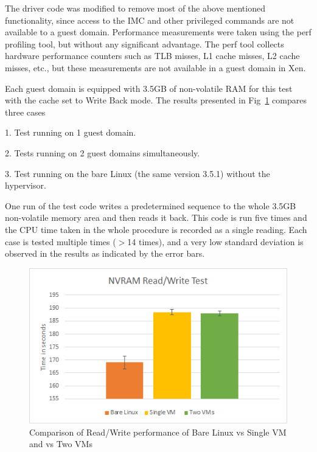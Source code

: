 The driver code was modified to remove most of the above mentioned functionality, since access to the IMC and other privileged commands are not available to a guest domain. Performance measurements were taken using the perf profiling tool, but without any significant advantage. The perf tool collects hardware performance counters such as TLB misses, L1 cache misses, L2 cache misses, etc., but these measurements are not available in a guest domain in Xen.

Each guest domain is equipped with 3.5GB of non-volatile RAM for this test with the cache set to Write Back mode. The results presented in Fig~\ref{fig:result_fig} compares three cases

1. Test running on 1 guest domain.

2. Tests running on 2 guest domains simultaneously.

3. Test running on the bare Linux (the same version 3.5.1) without the hypervisor.

One run of the test code writes a predetermined sequence to the whole 3.5GB non-volatile memory area and then reads it back. This code is run five times and the CPU time taken in the whole procedure is recorded as a single reading. Each case is tested multiple times ($>$14 times), and a very low standard deviation is observed in the results as indicated by the error bars. 


\begin{figure}[H]
\centering
\includegraphics{figures/read_write_test.png}
\caption{Comparison of Read/Write performance of Bare Linux vs Single VM and vs Two VMs}
\label{fig:result_fig}
\end{figure}



